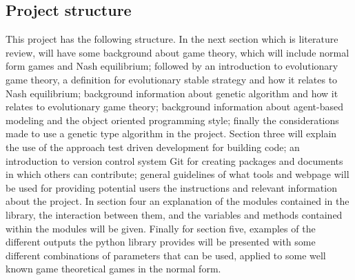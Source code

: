 \subsection{Project structure}
This project has the following structure. In the next section which is literature review, will have some background about game theory, which will include normal form games and Nash equilibrium; followed by an introduction to evolutionary game theory, a definition for evolutionary stable strategy and how it relates to Nash equilibrium; background information about genetic algorithm and how it relates to evolutionary game theory; background information about agent-based modeling and the object oriented programming style; finally the considerations made to use a genetic type algorithm in the project. Section three will explain the use of the approach test driven development for building code; an introduction to version control system Git for creating packages and documents in which others can contribute; general guidelines of what tools and webpage will be used for providing potential users the instructions and relevant information about the project. In section four an explanation of the modules contained in the library, the interaction between them, and the variables and methods contained within the modules will be given. Finally for section five, examples of the different outputs the python library provides will be presented with some different combinations of parameters that can be used, applied to some well known game theoretical games in the normal form.
